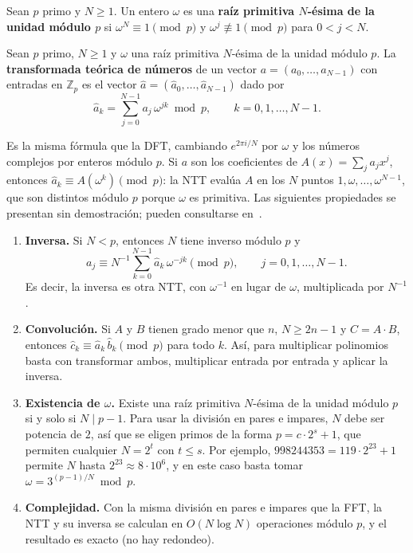 \begin{definition}
Sean $p$ primo y $N \ge 1$. Un entero $\omega$ es una \textbf{raíz primitiva $N$-ésima de la unidad módulo $p$} si $\omega^N \equiv 1 \pmod p$ y $\omega^j \not\equiv 1 \pmod p$ para $0 < j < N$.
\end{definition}

\begin{definition}[NTT]
Sean $p$ primo, $N\ge1$ y $\omega$ una raíz primitiva $N$-ésima de la unidad módulo $p$. La \textbf{transformada teórica de números} de un vector $a=(a_0,\dots,a_{N-1})$ con entradas en $\mathbb{Z}_p$ es el vector $\hat a=(\hat a_0,\dots,\hat a_{N-1})$ dado por~\cite{wiki_dft_ring}
\[
\hat a_k = \sum_{j=0}^{N-1} a_j\,\omega^{jk} \bmod p, \qquad k=0,1,\dots,N-1.
\]
\end{definition}

Es la misma fórmula que la DFT, cambiando $e^{2\pi i/N}$ por $\omega$ y los números complejos por enteros módulo $p$. Si $a$ son los coeficientes de $A(x)=\sum_{j}a_jx^j$, entonces $\hat a_k \equiv A(\omega^k) \pmod p$: la NTT evalúa $A$ en los $N$ puntos $1,\omega,\dots,\omega^{N-1}$, que son distintos módulo $p$ porque $\omega$ es primitiva. Las siguientes propiedades se presentan sin demostración; pueden consultarse en~\cite{wiki_dft_ring,cpalgos_fft}.

\begin{enumerate}
  \item \textbf{Inversa.} Si $N<p$, entonces $N$ tiene inverso módulo $p$ y
  \[
  a_j \equiv N^{-1}\sum_{k=0}^{N-1} \hat a_k\,\omega^{-jk} \pmod p, \qquad j=0,1,\dots,N-1.
  \]
  Es decir, la inversa es otra NTT, con $\omega^{-1}$ en lugar de $\omega$, multiplicada por $N^{-1}$.
  \item \textbf{Convolución.} Si $A$ y $B$ tienen grado menor que $n$, $N\ge 2n-1$ y $C=A\cdot B$, entonces $\hat c_k \equiv \hat a_k\,\hat b_k \pmod p$ para todo $k$. Así, para multiplicar polinomios basta con transformar ambos, multiplicar entrada por entrada y aplicar la inversa.
  \item \textbf{Existencia de $\omega$.} Existe una raíz primitiva $N$-ésima de la unidad módulo $p$ si y solo si $N \mid p-1$. Para usar la división en pares e impares, $N$ debe ser potencia de $2$, así que se eligen primos de la forma $p=c\cdot 2^s+1$, que permiten cualquier $N=2^t$ con $t \le s$. Por ejemplo, $998244353 = 119\cdot 2^{23}+1$ permite $N$ hasta $2^{23}\approx 8\cdot10^6$, y en este caso basta tomar $\omega = 3^{(p-1)/N} \bmod p$.
  \item \textbf{Complejidad.} Con la misma división en pares e impares que la FFT, la NTT y su inversa se calculan en $O(N\log N)$ operaciones módulo $p$, y el resultado es exacto (no hay redondeo).
\end{enumerate}

